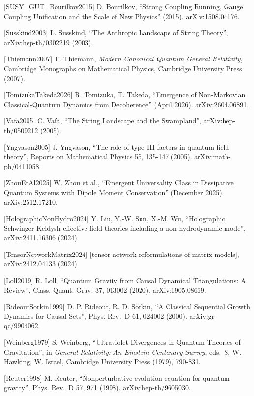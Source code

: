\documentclass[
]{article}
\begin{document}
{[}SUSY\_GUT\_Bourilkov2015{]} D. Bourilkov, ``Strong Coupling Running,
Gauge Coupling Unification and the Scale of New Physics'' (2015).
arXiv:1508.04176.

{[}Susskind2003{]} L. Susskind, ``The Anthropic Landscape of String
Theory'', arXiv:hep-th/0302219 (2003).

{[}Thiemann2007{]} T. Thiemann, \emph{Modern Canonical Quantum General
Relativity}, Cambridge Monographs on Mathematical Physics, Cambridge
University Press (2007).

{[}TomizukaTakeda2026{]} R. Tomizuka, T. Takeda, ``Emergence of
Non-Markovian Classical-Quantum Dynamics from Decoherence'' (April
2026). arXiv:2604.06891.

{[}Vafa2005{]} C. Vafa, ``The String Landscape and the Swampland'',
arXiv:hep-th/0509212 (2005).

{[}Yngvason2005{]} J. Yngvason, ``The role of type III factors in
quantum field theory'', Reports on Mathematical Physics 55, 135-147
(2005). arXiv:math-ph/0411058.

{[}ZhouEtAl2025{]} W. Zhou et al., ``Emergent Universality Class in
Dissipative Quantum Systems with Dipole Moment Conservation'' (December
2025). arXiv:2512.17210.

{[}HolographicNonHydro2024{]} Y. Liu, Y.-W. Sun, X.-M. Wu, ``Holographic
Schwinger-Keldysh effective field theories including a non-hydrodynamic
mode'', arXiv:2411.16306 (2024).

{[}TensorNetworkMatrix2024{]} {[}tensor-network reformulations of matrix
models{]}, arXiv:2412.04133 (2024).

{[}Loll2019{]} R. Loll, ``Quantum Gravity from Causal Dynamical
Triangulations: A Review'', Class. Quant. Grav. 37, 013002 (2020).
arXiv:1905.08669.

{[}RideoutSorkin1999{]} D. P. Rideout, R. D. Sorkin, ``A Classical
Sequential Growth Dynamics for Causal Sets'', Phys. Rev.~D 61, 024002
(2000). arXiv:gr-qc/9904062.

{[}Weinberg1979{]} S. Weinberg, ``Ultraviolet Divergences in Quantum
Theories of Gravitation'', in \emph{General Relativity: An Einstein
Centenary Survey}, eds.~S. W. Hawking, W. Israel, Cambridge University
Press (1979), 790-831.

{[}Reuter1998{]} M. Reuter, ``Nonperturbative evolution equation for
quantum gravity'', Phys. Rev.~D 57, 971 (1998). arXiv:hep-th/9605030.
\end{document}
